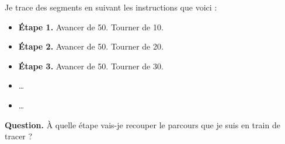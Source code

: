 \documentclass[class=report,crop=false, 12pt]{standalone}
\begin{document}
\begin{enigme}
Je trace des segments en suivant les instructions que voici :
\begin{itemize}
  \item \textbf{\'Etape 1.} Avancer de 50. Tourner de 10\textdegree.
  \item \textbf{\'Etape 2.} Avancer de 50. Tourner de 20\textdegree. 
  \item \textbf{\'Etape 3.} Avancer de 50. Tourner de 30\textdegree.   
  \item \ldots
  \item \ldots
\end{itemize}

\bigskip

\textbf{Question.} À quelle étape vais-je recouper le parcours que je suis en train de tracer ?



\end{enigme}
\end{document}
